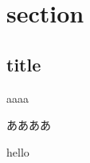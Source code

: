 \documentclass[a4paper]{jsarticle}
\begin{document}
\section{section}

  \subsection{title}
    aaaa

    ああああ

    hello
\end{document}
